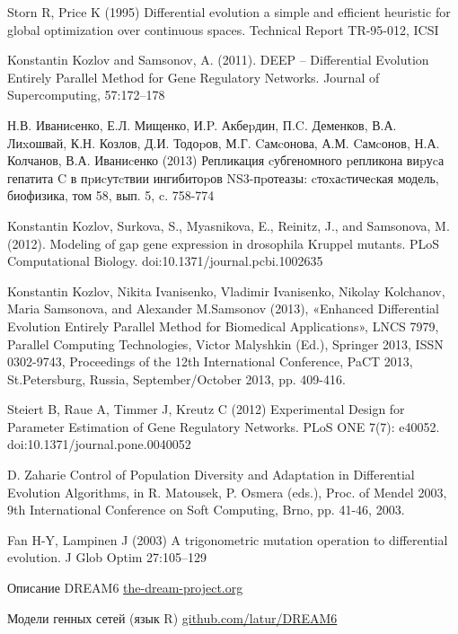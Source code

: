 
\begin{thebibliography}{20} %

	Storn R, Price K (1995) 
	Differential evolution a simple and efficient heuristic for global optimization over continuous spaces. Technical Report TR-95-012, ICSI
	
	Konstantin Kozlov and Samsonov, A. (2011). 
	DEEP – Differential Evolution Entirely Parallel Method for Gene Regulatory Networks. Journal of Supercomputing, 57:172–178
	
	Н.В. Иваниcенко, Е.Л. Мищенко, И.P. Акбеpдин, П.C. Деменков, В.А. Лиxошвай, К.Н. Козлов, Д.И. Тодоpов, М.Г. Cамcонова, А.М. Cамcонов, Н.А. Колчанов, В.А. Иваниcенко (2013) 
	Репликация cубгеномного pепликона виpуcа гепатита C в пpиcутcтвии ингибитоpов NS3-пpотеазы: cтоxаcтичеcкая модель, биофизика, том 58, вып. 5, c. 758-774

	Konstantin Kozlov, Surkova, S., Myasnikova, E., Reinitz, J., and Samsonova, M. (2012). 
	Modeling of gap gene expression in drosophila Kruppel mutants. PLoS Computational Biology. doi:10.1371/journal.pcbi.1002635

	Konstantin Kozlov, Nikita Ivanisenko, Vladimir Ivanisenko, Nikolay Kolchanov, Maria Samsonova, and Alexander M.Samsonov (2013), 
	«Enhanced Differential Evolution Entirely Parallel Method for Biomedical Applications», LNCS 7979, Parallel Computing Technologies, Victor Malyshkin (Ed.), 
	Springer 2013, ISSN 0302-9743, Proceedings of the 12th International Conference, PaCT 2013, St.Petersburg, Russia, September/October 2013, pp. 409-416.

	Steiert B, Raue A, Timmer J, Kreutz C (2012) 
	Experimental Design for Parameter Estimation of Gene Regulatory Networks. PLoS ONE 7(7): e40052. doi:10.1371/journal.pone.0040052
	
	D. Zaharie
	Control of Population Diversity and Adaptation in Differential Evolution Algorithms, 
	in R. Matousek, P. Osmera (eds.), Proc. of Mendel 2003, 9th International Conference on Soft Computing, Brno, pp. 41-46, 2003.
	
	Fan H-Y, Lampinen J (2003) 
	A trigonometric mutation operation to differential evolution. J Glob Optim 27:105–129
	
	Описание DREAM6 \href{http://www.the-dream-project.org/challenges/dream6-estimation-model-parameters-challenge}{the-dream-project.org}

	Модели генных сетей (язык R) \href{https://github.com/latur/DREAM6}{github.com/latur/DREAM6}

\end{thebibliography}
